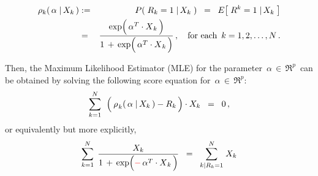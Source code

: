 \begin{proposition}
\begin{enumerate}
\begin{itemize}
\begin{eqnarray*}
		\rho_{k}(\,\alpha\;\vert\,X_{k}\,)
		& := &
			P\!\left(\; R_{k} = 1 \;\vert\, X_{k} \;\right)
		\;\; = \;\;
			E\!\left[\; R^{k}  = 1 \;\vert\, X_{k} \;\right]
		\\
		& = &
			\dfrac{
				\exp\!\left(\,\alpha^{T} \cdot \overset{{\color{white}.}}{X}_{k} \,\right)
				}{
				1 \,+\, \exp\!\left(\,\alpha^{T} \cdot \overset{{\color{white}.}}{X}_{k} \,\right)
				}\,,
		\quad
		\textnormal{for each \,$k = 1,2,\ldots,N$}\,.
		\end{eqnarray*}
	\end{itemize}
	Then, the Maximum Likelihood Estimator (MLE) for the parameter \,$\alpha \,\in\, \Re^{p}$\,
	can be obtained by solving the following score equation for \,$\alpha \,\in\, \Re^{p}$:
	\begin{equation*}
	\overset{N}{\underset{k=1}{\sum}}\;\,
	\left(\,\overset{{\color{white}-}}{\rho}_{k}(\,\alpha\;\vert\,X_{k}\,) - R_{k}\,\right)
	\cdot X_{k}
	\;\; = \;\; 0\,,
	\end{equation*}
	or equivalently but more explicitly,
	\begin{equation*}
	\overset{N}{\underset{k=1}{\sum}}\;\,
	\dfrac{X_{k}}{1 \,+\, \exp\!\left({\color{red}-}\,\alpha^{T} \cdot \overset{{\color{white}.}}{X}_{k}\,\right)}
	\;\; = \;\;
	\overset{N}{\underset{k\vert R_{k}=1}{\sum}}\; X_{k}
	\end{equation*}
\end{enumerate}
\end{proposition}
\proof
